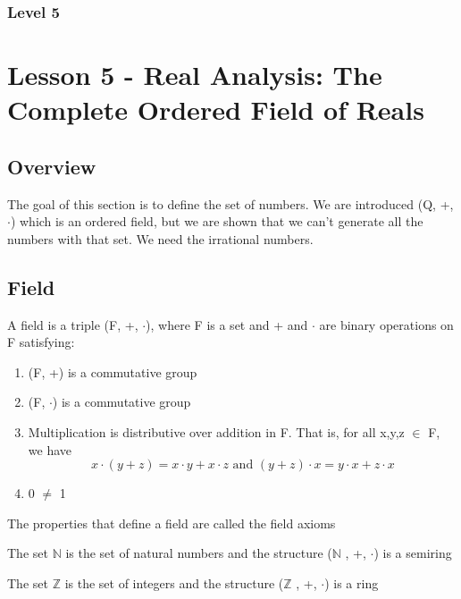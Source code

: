 \documentclass{article}
\begin{document}
\subsubsection{Level 5}
\pagebreak

\section{Lesson 5 - Real Analysis: The Complete Ordered Field of Reals}
\subsection{Overview}

The goal of this section is to define the set of numbers. We are introduced
(Q, +, $\cdot$) which is an ordered field, but we are shown that we can't
generate all the numbers with that set. We need the irrational numbers.

\subsection{Field}

\begin{definition}[Field]
    A field is a triple (F, +, $\cdot $), where F is a set and + and $ \cdot$
    are binary operations on F satisfying:
    \begin{enumerate}
	\item (F, +) is a commutative group
	\item (F, $\cdot $) is a commutative group
	\item Multiplication is distributive over addition in F. That is, for all
	    x,y,z $\in $ F, we have
	    $$ x \cdot (y+z) = x \cdot y + x \cdot z \text{ and }
	    (y+z) \cdot x = y \cdot x + z \cdot x $$
	\item 0 $\neq$ 1
    \end{enumerate}

    The properties that define a field are called the field axioms
\end{definition}

\begin{lemma}
    The set $ \mathbb{N} $ is the set of natural numbers and the structure
    ($ \mathbb{N} $ , +, $\cdot $) is a semiring
\end{lemma}

\begin{lemma}
    The set $ \mathbb{Z} $ is the set of integers and the structure
    ($ \mathbb{Z} $ , +, $\cdot $) is a ring
\end{lemma}
\end{document}
